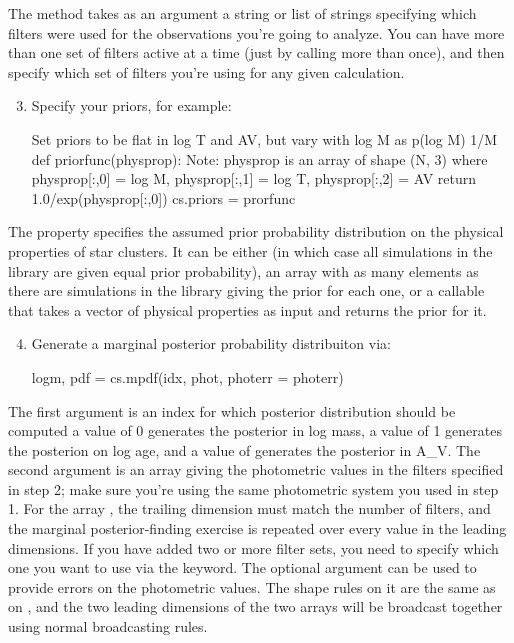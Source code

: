 \documentclass[letterpaper,10pt,english]{sphinxmanual}
\begin{document}
The  method takes as an argument a string or list of strings specifying which filters were used for the observations you’re going to analyze. You can have more than one set of filters active at a time (just by calling  more than once), and then specify which set of filters you’re using for any given calculation.
\begin{enumerate}
\setcounter{enumi}{2}
\item {} 
Specify your priors, for example:

\begin{sphinxVerbatim}[commandchars=\\\{\}]
\PYGZsh{} Set priors to be flat in log T and A\PYGZus{}V, but vary with log M as
\PYGZsh{} p(log M) \PYGZti{} 1/M
def priorfunc(physprop):
   \PYGZsh{} Note: physprop is an array of shape (N, 3) where physprop[:,0] =
   \PYGZsh{} log M, physprop[:,1] = log T, physprop[:,2] = A\PYGZus{}V
   return 1.0/exp(physprop[:,0])
cs.priors = prorfunc
\end{sphinxVerbatim}

\end{enumerate}

The  property specifies the assumed prior probability distribution on the physical properties of star clusters. It can be either  (in which case all simulations in the library are given equal prior probability), an array with as many elements as there are simulations in the library giving the prior for each one, or a callable that takes a vector of physical properties as input and returns the prior for it.
\begin{enumerate}
\setcounter{enumi}{3}
\item {} 
Generate a marginal posterior probability distribuiton via:

\begin{sphinxVerbatim}[commandchars=\\\{\}]
logm, pdf = cs.mpdf(idx, phot, photerr = photerr)
\end{sphinxVerbatim}

\end{enumerate}

The first argument  is an index for which posterior distribution should be computed \textendash{} a value of 0 generates the posterior in log mass, a value of 1 generates the posterion on log age, and a value of generates the posterior in A\_V. The second argument  is an array giving the photometric values in the filters specified in step 2; make sure you’re using the same photometric system you used in step 1. For the array , the trailing dimension must match the number of filters, and the marginal posterior-finding exercise is repeated over every value in the leading dimensions. If you have added two or more filter sets, you need to specify which one you want to use via the  keyword. The optional argument  can be used to provide errors on the photometric values. The shape rules on it are the same as on , and the two leading dimensions of the two arrays will be broadcast together using normal broadcasting rules.
\end{document}
